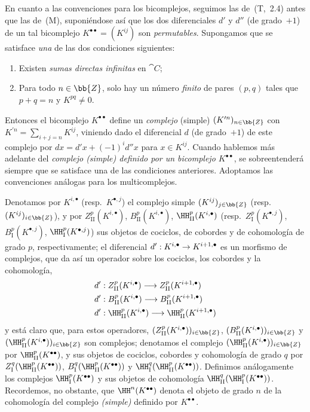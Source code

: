\documentclass[oneside]{amsart}
\makeatletter
\newcommand{\ega@arrow}[2]{\mathchoice{#1}{#2}{#2}{#2}}
\renewcommand{\to}{\ega@arrow{\longrightarrow}{\rightarrow}}
\let\EGAOriginalLabel\label
\renewcommand{\label}[1]{\phantomsection\EGAOriginalLabel{#1}}
\makeatother
\begin{document}
\begin{env}[11.3.1]
\label{0.11.3.1}
En cuanto a las convenciones para los bicomplejos, seguimos las de~(T,~2.4) antes que las de~(M), suponiéndose así que los dos diferenciales $d'$ y $d''$ (de grado~$+1$) de un tal bicomplejo $K^{\bullet\bullet}=(K^{ij})$ son \emph{permutables}.
Supongamos que se satisface \emph{una} de las dos condiciones siguientes:
\begin{enumerate}
   \item Existen \emph{sumas directas infinitas} en $\cat{C}$;
   \item Para todo $n\in\bb{Z}$, solo hay un número \emph{finito} de pares $(p,q)$ tales que $p+q=n$ y $K^{pq}\neq 0$.
 \end{enumerate}
Entonces el bicomplejo $K^{\bullet\bullet}$ define un \emph{complejo} (simple) $(K^{\prime n})_{n\in\bb{Z}}$ con $K^{\prime n}=\sum_{i+j=n}K^{ij}$, viniendo dado el diferencial $d$ (de grado~$+1$) de este complejo por $dx=d'x+(-1)^i d''x$ para $x\in K^{ij}$.
Cuando hablemos más adelante del \emph{complejo (simple) definido por un bicomplejo $K^{\bullet\bullet}$}, se sobreentenderá siempre que se satisface una de las condiciones anteriores.
Adoptamos las convenciones análogas para los multicomplejos.

Denotamos por $K^{i,\bullet}$ (resp.~$K^{\bullet,j}$) el complejo simple $(K^{ij})_{j\in\bb{Z}}$ (resp.~$(K^{ij})_{i\in\bb{Z}}$), y por $Z_\mathrm{II}^p(K^{i,\bullet})$, $B_\mathrm{II}^p(K^{i,\bullet})$, $\HH_\mathrm{II}^p(K^{i,\bullet})$ (resp.~$Z_\mathrm{I}^p(K^{\bullet,j})$, $B_\mathrm{I}^p(K^{\bullet,j})$, $\HH_\mathrm{I}^p(K^{\bullet,j})$) sus objetos de cociclos, de cobordes y de cohomología de grado $p$, respectivamente;
el diferencial $d':K^{i,\bullet}\to K^{i+1,\bullet}$ es un morfismo de complejos, que da así un operador sobre los cociclos, los cobordes y la cohomología,
\begin{align*}
  d'&:Z_\mathrm{II}^p(K^{i,\bullet})\to Z_\mathrm{II}^p(K^{i+1,\bullet})
\\d'&:B_\mathrm{II}^p(K^{i,\bullet})\to B_\mathrm{II}^p(K^{i+1,\bullet})
\\d'&:\HH_\mathrm{II}^p(K^{i,\bullet})\to\HH_\mathrm{II}^p(K^{i+1,\bullet})
\end{align*}
y está claro que, para estos operadores, $(Z_\mathrm{II}^p(K^{i,\bullet}))_{i\in\bb{Z}}$, $(B_\mathrm{II}^p(K^{i,\bullet}))_{i\in\bb{Z}}$ y $(\HH_\mathrm{II}^p(K^{i,\bullet}))_{i\in\bb{Z}}$ son complejos;
denotamos el complejo $(\HH_\mathrm{II}^p(K^{i,\bullet}))_{i\in\bb{Z}}$ por $\HH_\mathrm{II}^p(K^{\bullet\bullet})$, y sus objetos de cociclos, cobordes y cohomología de grado $q$ por $Z_\mathrm{I}^q(\HH_\mathrm{II}^p(K^{\bullet\bullet}))$, $B_\mathrm{I}^q(\HH_\mathrm{II}^p(K^{\bullet\bullet}))$ y $\HH_\mathrm{I}^q(\HH_\mathrm{II}^p(K^{\bullet\bullet}))$.
Definimos análogamente los complejos $\HH_\mathrm{I}^p(K^{\bullet\bullet})$ y sus objetos de cohomología $\HH_\mathrm{II}^q(\HH_\mathrm{I}^p(K^{\bullet\bullet}))$.
Recordemos, no obstante, que $\HH^n(K^{\bullet\bullet})$ denota el objeto de grado $n$ de la cohomología del complejo \emph{(simple)} definido por $K^{\bullet\bullet}$.
\end{env}
\end{document}
